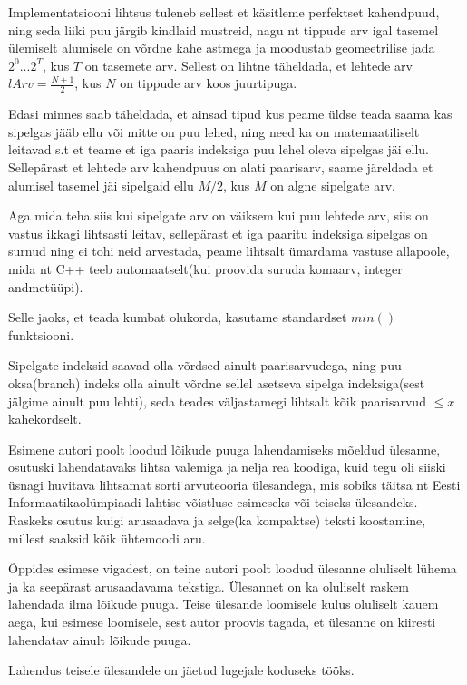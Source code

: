 \documentclass{trkut}
\theoremstyle{definition}
\begin{document}
    Implementatsiooni lihtsus tuleneb sellest et käsitleme perfektset kahendpuud, ning seda liiki puu järgib kindlaid mustreid, nagu nt tippude arv igal tasemel ülemiselt alumisele on võrdne kahe astmega ja moodustab geomeetrilise jada $2^0...2^T$, kus $T$ on tasemete arv. 
    Sellest on lihtne täheldada, et lehtede arv $lArv = \frac{N+1}{2}$, kus $N$ on tippude arv koos juurtipuga.

    Edasi minnes saab täheldada, et ainsad tipud kus peame üldse teada saama kas sipelgas jääb ellu või mitte on puu lehed, ning need ka on matemaatiliselt leitavad s.t et teame et iga paaris indeksiga puu lehel oleva sipelgas jäi ellu. Sellepärast et lehtede arv kahendpuus on alati paarisarv, saame järeldada et alumisel tasemel jäi sipelgaid ellu $M/2$, kus $M$ on algne sipelgate arv.

    Aga mida teha siis kui sipelgate arv on väiksem kui puu lehtede arv, siis on vastus ikkagi lihtsasti leitav, sellepärast et iga paaritu indeksiga sipelgas on surnud ning ei tohi neid arvestada, peame lihtsalt ümardama vastuse allapoole, mida nt C++ teeb automaatselt(kui proovida suruda komaarv, integer andmetüüpi).

    Selle jaoks, et teada kumbat olukorda, kasutame standardset $min()$ funktsiooni.

    Sipelgate indeksid saavad olla võrdsed ainult paarisarvudega, ning puu oksa(branch) indeks olla ainult võrdne sellel asetseva sipelga indeksiga(sest jälgime ainult puu lehti), seda teades väljastamegi lihtsalt kõik paarisarvud $\le x$ kahekordselt.


    

Esimene autori poolt loodud lõikude puuga lahendamiseks mõeldud ülesanne, osutuski lahendatavaks lihtsa valemiga ja nelja rea koodiga, kuid tegu oli siiski üsnagi huvitava lihtsamat sorti arvuteooria ülesandega, mis sobiks täitsa nt Eesti Informaatikaolümpiaadi lahtise võistluse esimeseks või teiseks ülesandeks.
Raskeks osutus kuigi arusaadava ja selge(ka kompaktse) teksti koostamine, millest saaksid kõik ühtemoodi aru.  

Õppides esimese vigadest, on teine autori poolt loodud ülesanne oluliselt lühema ja ka seepärast arusaadavama tekstiga. 
Ülesannet on ka oluliselt raskem lahendada ilma lõikude puuga.
Teise ülesande loomisele kulus oluliselt kauem aega, kui esimese loomisele, sest autor proovis tagada, et ülesanne on kiiresti lahendatav ainult lõikude puuga. 

Lahendus teisele ülesandele on jäetud lugejale koduseks tööks.
\end{document}
